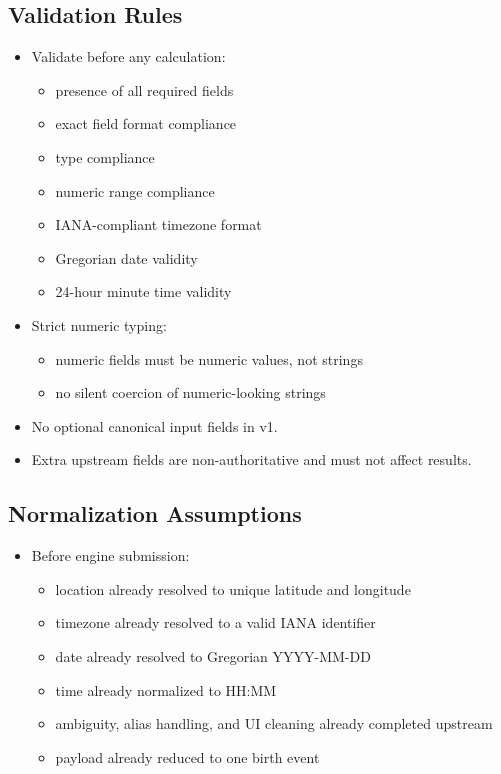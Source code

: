 \documentclass[11pt]{article}
\begin{document}
\subsection{Validation Rules}
\label{sec:org93c34bd}
\begin{itemize}
\item Validate before any calculation:
\begin{itemize}
\item presence of all required fields
\item exact field format compliance
\item type compliance
\item numeric range compliance
\item IANA-compliant timezone format
\item Gregorian date validity
\item 24-hour minute time validity
\end{itemize}
\item Strict numeric typing:
\begin{itemize}
\item numeric fields must be numeric values, not strings
\item no silent coercion of numeric-looking strings
\end{itemize}
\item No optional canonical input fields in v1.
\item Extra upstream fields are non-authoritative and must not affect results.
\end{itemize}
\subsection{Normalization Assumptions}
\label{sec:org6493c92}
\begin{itemize}
\item Before engine submission:
\begin{itemize}
\item location already resolved to unique latitude and longitude
\item timezone already resolved to a valid IANA identifier
\item date already resolved to Gregorian YYYY-MM-DD
\item time already normalized to HH:MM
\item ambiguity, alias handling, and UI cleaning already completed upstream
\item payload already reduced to one birth event
\end{itemize}
\end{itemize}
\end{document}
